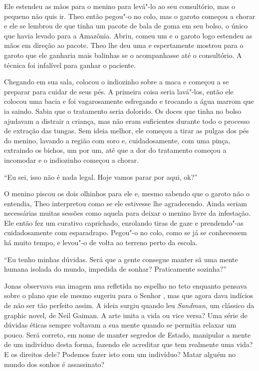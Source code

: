 Ele estendeu as mãos para o menino para levá"-lo ao seu consultório, mas
o pequeno não quis ir. Theo então pegou"-o no colo, mas o garoto começou
a chorar e ele se lembrou de que tinha um pacote de bala de goma em seu
bolso, o único que havia levado para a Amazônia. Abriu, comeu um e o
garoto logo estendeu as mãos em direção ao pacote. Theo lhe deu uma e
espertamente mostrou para o garoto que ele ganharia mais balinhas se o
acompanhasse até o consultório. A técnica foi infalível para ganhar o
paciente.

Chegando em sua sala, colocou o indiozinho sobre a maca e começou a se
preparar para cuidar de seus pés. A primeira coisa seria lavá"-los, então
ele colocou uma bacia e foi vagarosamente esfregando e trocando a água
marrom que ia saindo. Sabia que o tratamento seria dolorido. Os doces
que tinha no bolso ajudavam a distrair a criança, mas não eram
suficientes durante todo o processo de extração das tungas. Sem ideia
melhor, ele começou a tirar as pulgas dos pés do menino, lavando a
região com soro e, cuidadosamente, com uma pinça, extraindo os bichos,
um por um, até que a dor do tratamento começou a incomodar e o
indiozinho começou a chorar.

``Eu sei, isso não é nada legal. Hoje vamos parar por aqui, ok?''

O menino piscou os dois olhinhos para ele e, mesmo sabendo que o garoto
não o entendia, Theo interpretou como se ele estivesse lhe agradecendo.
Ainda seriam necessárias muitas sessões como aquela para deixar o menino
livre da infestação. Ele então fez um curativo caprichado, enrolando
tiras de gaze e prendendo"-as cuidadosamente com esparadrapo. Pegou"-o no
colo, como se já se conhecessem há muito tempo, e levou"-o de volta ao
terreno perto da escola.

\asterisc


``Eu tenho minhas dúvidas. Será que a gente consegue manter sã uma mente
humana isolada do mundo, impedida de sonhar? Praticamente sozinha?''

Jonas observava sua imagem nua refletida no espelho no teto enquanto
pensava sobre o plano que ele mesmo sugeriu para o Senhor , mas que
agora dava indícios de não ser tão perfeito assim. A ideia surgiu
quando leu \emph{Sandman}, um clássico da graphic novel, de Neil Gaiman. A
arte imita a vida ou vice versa? Uma série de dúvidas éticas sempre
voltavam a sua mente quando se permitia relaxar um pouco. Será correto,
em nome de manter segredos de Estado, manipular a mente de um indivíduo
desta forma, fazendo ele acreditar que tem realmente uma vida? E os
direitos dele? Podemos fazer isto com um indivíduo? Matar alguém no
mundo dos sonhos é assassinato?

